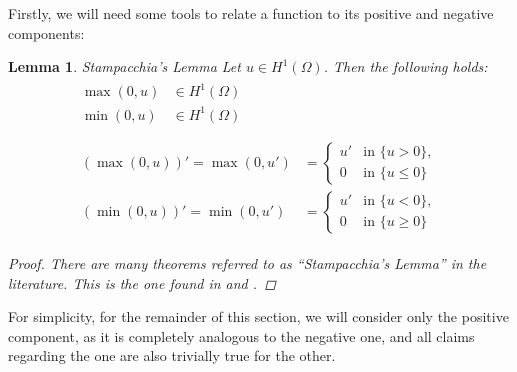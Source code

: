 \documentclass[headsepline,footsepline,footinclude=false,oneside,fontsize=11pt,paper=a4,listof=totoc,bibliography=totoc]{scrbook} %
\newtheorem{lemma}{Lemma}
\begin{document}
Firstly, we will need some tools to relate a function to its positive and negative components:

\begin{lemma} Stampacchia's Lemma \newline
	Let $u \in H^1(\Omega)$. Then the following holds:
	\begin{align}
	\begin{split} \label{eq:stampacchia_H1}
	\max(0,u) &\in H^1(\Omega) \\
	\min(0,u) &\in H^1(\Omega)
	\end{split} \\
	\nonumber \\ 
	\begin{split} \label{eq:stampacchia_derivative}
	\left(\max(0,u)\right)' = \max(0,u') &= \begin{cases}
	u' &\text{in}\,\, \{u > 0\}, \\
	0  &\text{in}\,\, \{u \leq 0\}
	\end{cases} \\
	\left(\min(0,u)\right)' = \min(0,u') &= \begin{cases}
	u' &\text{in}\,\, \{u < 0\}, \\
	0  &\text{in}\,\, \{u \geq 0\}
	\end{cases}
	\end{split}
	\end{align}
	\begin{proof}
		There are many theorems referred to as ``Stampacchia's Lemma'' in the literature. This is the one found in \cite[Theorem A.1]{KinderlehrerStampacchia} and \cite[Theorem 5.8.2]{Attouch09}.
	\end{proof}
\end{lemma}


For simplicity, for the remainder of this section, we will consider only the positive component, as it is completely analogous to the negative one, and all claims regarding the one are also trivially true for the other.
\end{document}
